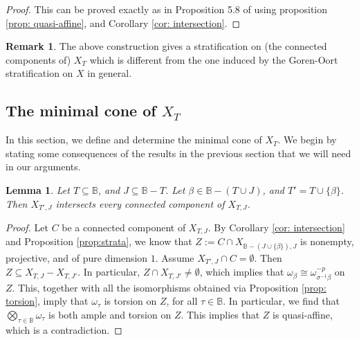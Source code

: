 \documentclass[11pt,pdflatex]{amsart}
\theoremstyle{plain}
\newtheorem{lemma}[theorem]{Lemma}
\theoremstyle{definition}
\newtheorem{remark}[theorem]{Remark}
\theoremstyle{plain}
\theoremstyle{definition}
\theoremstyle{remark}
\numberwithin{equation}{section}
\numberwithin{figure}{section} \numberwithin{table}{subsection}
\def\BB{\mathbb{B}}
\begin{document}
\begin{proof} This can be proved exactly as in Proposition 5.8 of \cite{DK2} using proposition \ref{prop: quasi-affine}, and Corollary \ref{cor: intersection}.
\end{proof}



\begin{remark} The above construction gives a stratification on 
(the connected components of) $X_T$ which is different from the one induced by the Goren-Oort stratification on $X$ in general.
\end{remark}

\subsection{The minimal cone of $X_T$} In this section, we define and determine the minimal cone of $X_T$. We begin by stating some consequences of the results in the previous section that we will need in our arguments.

 \begin{lemma}\label{lemma: h intersect f} Let $T \subseteq \BB$, and $J \subseteq \BB-T$. Let $\beta \in \BB-(T \cup J)$, and $T'=T \cup\{\beta\}$. Then $X_{T',J}$ intersects every connected component of $X_{T,J}$.
\end{lemma}

\begin{proof} Let $C$ be a connected component of $X_{T,J}$. By Corollary \ref{cor: intersection} and Proposition \ref{prop:strata}, we know that $Z:=C \cap X_{\BB-(J \cup \{\beta\}),J}$ is nonempty, projective, and of pure dimension $1$. Assume $X_{T',J}\cap C =\emptyset$. Then $Z \subseteq  X_{T,J}-X_{T,J'}$. In particular, $Z \cap X_{T,J'}\neq \emptyset$, which implies that $\omega_\beta\cong\omega_{\sigma^{-1}\beta}^{-p}$ on $Z$. This, together with all the isomorphisms obtained via Proposition \ref{prop: torsion}, imply that $\omega_\tau$ is torsion on $Z$, for all $\tau \in \BB$. In particular,  we find that $\bigotimes_{\tau\in \BB} \omega_\tau$ is both ample and torsion on $Z$. This implies that $Z$ is quasi-affine, which is a contradiction. \end{proof}
\end{document}
